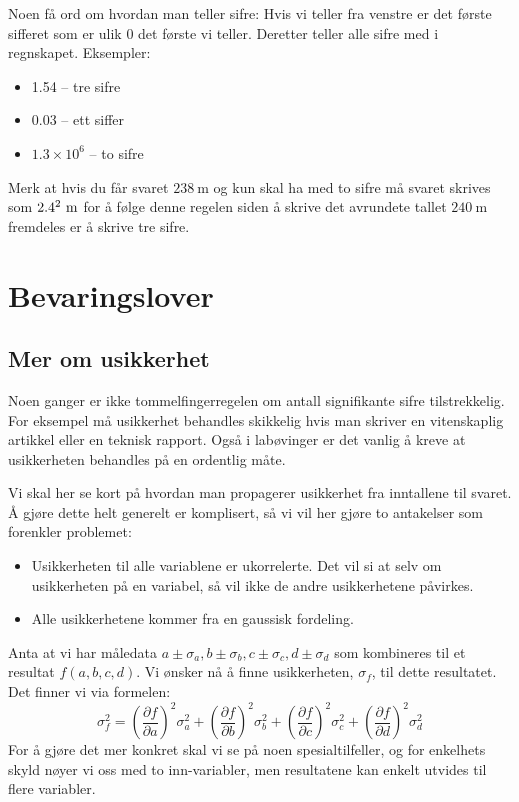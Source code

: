 \documentclass[a4paper,norsk,12pt]{book}
\begin{document}
Noen få ord om hvordan man teller sifre: Hvis vi teller fra venstre er det første sifferet som er ulik 0 det første vi teller. Deretter teller alle sifre med i regnskapet. Eksempler:
\begin{itemize}
	\item 1.54 -- tre sifre
	\item 0.03 -- ett siffer
	\item$1.3\times10^6$ -- to sifre
\end{itemize}
Merk at hvis du får svaret $238~\mathrm{m}$ og kun skal ha med to sifre må svaret skrives som $2.4\time10^2~\mathrm{m}$ for å følge denne regelen siden å skrive det avrundete tallet $240~\mathrm{m}$ fremdeles er å skrive tre sifre.

\chapter{Bevaringslover}

\section{Mer om usikkerhet}
Noen ganger er ikke tommelfingerregelen om antall signifikante sifre tilstrekkelig. For eksempel må usikkerhet behandles skikkelig hvis man skriver en vitenskaplig artikkel eller en teknisk rapport. Også i labøvinger er det vanlig å kreve at usikkerheten behandles på en ordentlig måte. 

Vi skal her se kort på hvordan man propagerer usikkerhet fra inntallene til svaret. Å gjøre dette helt generelt er komplisert, så vi vil her gjøre to antakelser som forenkler problemet:
\begin{itemize}
\item
Usikkerheten til alle variablene er ukorrelerte. Det vil si at selv om usikkerheten på en variabel, så vil ikke de andre 	usikkerhetene påvirkes.
\item
Alle usikkerhetene kommer fra en gaussisk fordeling. 
\end{itemize}
Anta at vi har måledata $a\pm\sigma_a,b\pm\sigma_b,c\pm\sigma_c,d\pm\sigma_d$ som kombineres til et resultat $f(a,b,c,d)$. Vi ønsker nå å finne usikkerheten, $\sigma_f$, til dette resultatet. Det finner vi via formelen:
\begin{displaymath}
	\sigma_f^2 =
	\left(\frac{\partial f}{\partial a}\right)^2\sigma_a^2 + \left(\frac{\partial f}{\partial b}\right)^2\sigma_b^2 + 
	\left(\frac{\partial f}{\partial c}\right)^2\sigma_c^2 + \left(\frac{\partial f}{\partial d}\right)^2\sigma_d^2 
\end{displaymath}
For å gjøre det mer konkret skal vi se på noen spesialtilfeller, og for enkelhets skyld nøyer vi oss med to inn-variabler, men resultatene kan enkelt utvides til flere variabler.
\end{document}

